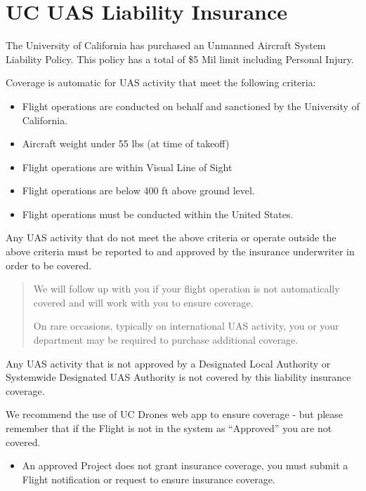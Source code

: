 \documentclass[
]{book}
\providecommand{\tightlist}{%
  \setlength{\itemsep}{0pt}\setlength{\parskip}{0pt}}
\begin{document}
\hypertarget{ch-liability-insurance}{%
\chapter{UC UAS Liability Insurance}\label{ch-liability-insurance}}

The University of California has purchased an Unmanned Aircraft System Liability Policy. This policy has a total of \$5 Mil limit including Personal Injury.

Coverage is automatic for UAS activity that meet the following criteria:

\begin{itemize}
\tightlist
\item
  Flight operations are conducted on behalf and sanctioned by the University of California.
\item
  Aircraft weight under 55 lbs (at time of takeoff)
\item
  Flight operations are within Visual Line of Sight
\item
  Flight operations are below 400 ft above ground level.
\item
  Flight operations must be conducted within the United States.
\end{itemize}

Any UAS activity that do not meet the above criteria or operate outside the above criteria must be reported to and approved by the insurance underwriter in order to be covered.

\begin{quote}
We will follow up with you if your flight operation is not automatically covered and will work with you to ensure coverage.

On rare occasions, typically on international UAS activity, you or your department may be required to purchase additional coverage.
\end{quote}

Any UAS activity that is not approved by a Designated Local Authority or Systemwide Designated UAS Authority is not covered by this liability insurance coverage.

We recommend the use of UC Drones web app to ensure coverage - but please remember that if the Flight is not in the system as ``Approved'' you are not covered.

\begin{itemize}
\tightlist
\item
  An approved Project does not grant insurance coverage, you must submit a Flight notification or request to ensure insurance coverage.
\end{itemize}
\end{document}
